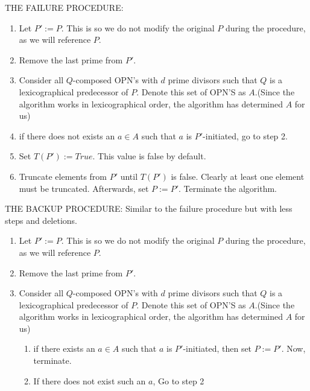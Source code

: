 \documentclass[../paper.tex]{subfiles}
\begin{document}
THE FAILURE PROCEDURE:

\begin{enumerate}[label*=\arabic*.]

  \item Let $P' := P$. This is so we do not modify the original
        $P$ during the procedure, as we will reference $P$.  

  \item Remove the last prime from $P'$.

  \item \label{fail_loop}
        Consider all $Q$-composed OPN's with $d$ prime divisors
such
        that $Q$ is a lexicographical predecessor of $P$. Denote
        this set of OPN'S as $A$.(Since the algorithm works in
        lexicographical order, the algorithm has determined $A$
        for us) 

  \item if there does not exists an $a \in A$ such that $a$ is
    $P'$-initiated, go to step 2.

  \item Set $T(P') := True$. This value is false by default.

  \item Truncate elements from $P'$ until $T(P')$ is false.
        Clearly at least one element must be truncated.
        Afterwards, set $P := P'$. Terminate the algorithm.
\end{enumerate}

THE BACKUP PROCEDURE: Similar to the failure procedure but with
less steps and deletions.

\begin{enumerate}[label*=\arabic*.]

  \item Let $P' := P$. This is so we do not modify the original
        $P$ during the procedure, as we will reference $P$.  

  \item Remove the last prime from $P'$.

  \item \label{fail_loop}
        Consider all $Q$-composed OPN's with $d$ prime divisors
such
        that $Q$ is a lexicographical predecessor of $P$. Denote
        this set of OPN'S as $A$.(Since the algorithm works in
        lexicographical order, the algorithm has determined $A$
        for us)

  \begin{enumerate}[label*=\arabic*.]

    \item if there exists an $a \in A$ such that $a$ is
    $P'$-initiated, then set $P := P'$. Now, terminate.

    \item If there does not exist such an $a$, Go to step 2

  \end{enumerate}

\end{enumerate}
\end{document}
